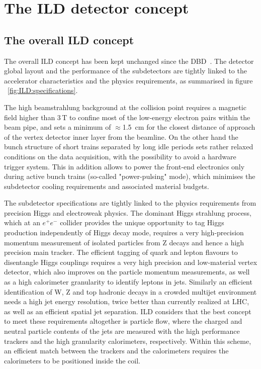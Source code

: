 \chapter{The ILD detector concept}
\label{chap:ILD}

\section{The overall ILD concept}

The overall ILD concept has been kept unchanged since the DBD~\cite{ild:bib:ilddbd}. The detector global layout and the performance of the subdetectors are tightly linked to the accelerator characteristics and the physics requirements, as summarised in figure ~\ref{fig:ILD:specifications}. 

The high beamstrahlung background at the collision point requires a magnetic field higher than 3\,T to confine most of the low-energy electron pairs  within the beam pipe, and sets a minimum of $\approx$1.5~cm for the closest distance of approach of the vertex detector inner layer from the beamline. On the other hand the bunch structure of short trains separated by long idle periods sets rather relaxed conditions on the data acquisition, with the possibility to avoid a hardware trigger system. This in addition allows to power the front-end electronics only during active bunch trains (so-called "power-pulsing" mode), which minimises the subdetector cooling requirements and associated material budgets.  

The subdetector specifications are tightly linked to the physics requirements from precision Higgs and electroweak physics. The dominant Higgs strahlung process, which at an $e^+e^-$ collider provides the unique opportunity to tag Higgs production independently of Higgs decay mode, requires a very high-precision momentum measurement of isolated particles from Z decays and hence a high precision main tracker. The efficient tagging of quark and lepton flavours to disentangle Higgs couplings requires a very high precision and low-material vertex detector, which also improves on the particle momentum measurements, as well as a high calorimeter granularity to identify leptons in jets. Similarly an efficient identification of W, Z and top hadronic decays in a crowded multijet environment needs a high jet energy resolution, twice better than currently realized at LHC, as well as an efficient spatial jet separation. ILD considers that the best concept to meet these requirements altogether is particle flow, where the charged and neutral particle contents of the jets are measured with the high performance trackers and the high granularity calorimeters, respectively. Within this scheme, an efficient match between the trackers and the calorimeters requires the calorimeters to be positioned inside the coil.     

